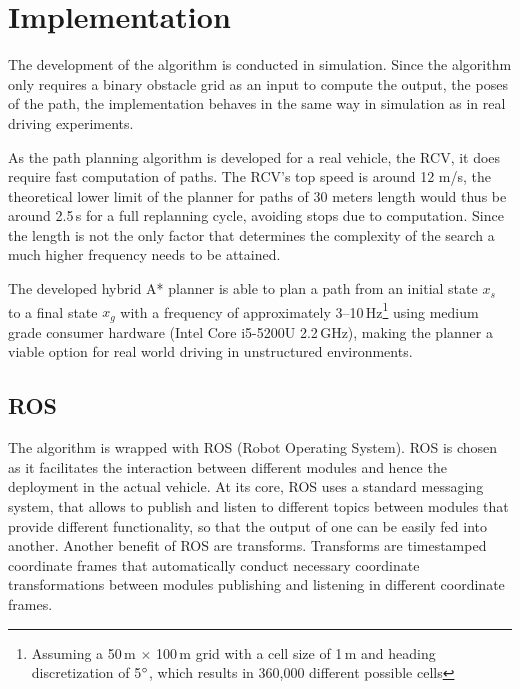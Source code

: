 \chapter{Implementation}
The development of the algorithm is conducted in simulation. Since the algorithm only requires a binary obstacle grid as an input to compute the output, the poses of the path, the implementation behaves in the same way in simulation as in real driving experiments.

As the path planning algorithm is developed for a real vehicle, the RCV, it does require fast computation of paths. The RCV's top speed is around 12 m/s, the theoretical lower limit of the planner for paths of 30 meters length would thus be around 2.5\,s for a full replanning cycle, avoiding stops due to computation. Since the length is not the only factor that determines the complexity of the search a much higher frequency needs to be attained.

The developed hybrid A* planner is able to plan a path from an initial state $x_s$ to a final state $x_g$ with a frequency of approximately 3--10\,Hz\footnote{\label{fot:grid}Assuming a 50\,m $\times$ 100\,m grid with a cell size of 1\,m and heading discretization of 5$\degree$, which results in 360,000 different possible cells} using medium grade consumer hardware (Intel Core i5-5200U 2.2\,GHz), making the planner a viable option for real world driving in unstructured environments.

\section{ROS}
The algorithm is wrapped with ROS (Robot Operating System). ROS is chosen as it facilitates the interaction between different modules and hence the deployment in the actual vehicle. At its core, ROS uses a standard messaging system, that allows to publish and listen to different topics between modules that provide different functionality, so that the output of one can be easily fed into another. Another benefit of ROS are transforms. Transforms are timestamped coordinate frames that automatically conduct necessary coordinate transformations between modules publishing and listening in different coordinate frames.

